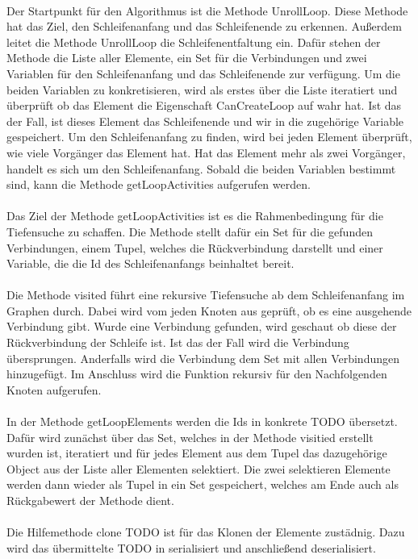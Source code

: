 \documentclass{article}
\begin{document}
    \\
    Der Startpunkt für den Algorithmus ist die Methode UnrollLoop.
    Diese Methode hat das Ziel, den Schleifenanfang und das Schleifenende zu erkennen. Außerdem leitet die Methode UnrollLoop die Schleifenentfaltung ein.
    Dafür stehen der Methode die Liste aller Elemente, ein Set für die Verbindungen und zwei Variablen für den Schleifenanfang und das Schleifenende zur verfügung.
    Um die beiden Variablen zu konkretisieren, wird als erstes über die Liste iteratiert und überprüft ob das Element die Eigenschaft CanCreateLoop auf wahr hat. Ist das der Fall, ist dieses Element das Schleifenende und wir in die zugehörige Variable gespeichert.
    Um den Schleifenanfang zu finden, wird bei jeden Element überprüft, wie viele Vorgänger das Element hat. 
    Hat das Element mehr als zwei Vorgänger, handelt es sich um den Schleifenanfang.
    Sobald die beiden Variablen bestimmt sind, kann die Methode getLoopActivities aufgerufen werden.\\
    \\
    Das Ziel der Methode getLoopActivities ist es die Rahmenbedingung für die Tiefensuche zu schaffen.
    Die Methode stellt dafür ein Set für die gefunden Verbindungen, einem Tupel, welches die Rückverbindung darstellt und einer Variable, die die Id des Schleifenanfangs beinhaltet bereit.
    \\
    \\
    Die Methode visited führt eine rekursive Tiefensuche ab dem Schleifenanfang im Graphen durch.
    Dabei wird vom jeden Knoten aus geprüft, ob es eine ausgehende Verbindung gibt.
    Wurde eine Verbindung gefunden, wird geschaut ob diese der Rückverbindung der Schleife ist.
    Ist das der Fall wird die Verbindung übersprungen. Anderfalls wird die Verbindung dem Set mit allen Verbindungen hinzugefügt.
    Im Anschluss wird die Funktion rekursiv für den Nachfolgenden Knoten aufgerufen.\\
    \\
    In der Methode getLoopElements werden die Ids in konkrete TODO übersetzt.
    Dafür wird zunächst über das Set, welches in der Methode visitied erstellt wurden ist, iteratiert und für jedes Element aus dem Tupel das dazugehörige Object aus der Liste aller Elementen selektiert.
    Die zwei selektieren Elemente werden dann wieder als Tupel in ein Set gespeichert, welches am Ende auch als Rückgabewert der Methode dient.\\
    \\
    Die Hilfemethode clone TODO ist für das Klonen der Elemente zustädnig. Dazu wird das übermittelte TODO in serialisiert und anschließend deserialisiert.
\end{document}
